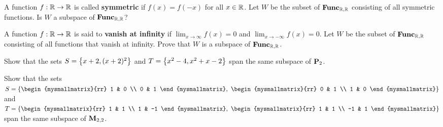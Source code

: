 \begin{ex}
  A function $f:\mathbb{R}\to\mathbb{R}$ is called \textbf{symmetric}%
   if $f(x)=f(-x)$ for all $x\in\mathbb{R}$.  Let
  $W$ be the subset of $\mathbf{Func}_{\mathbb{R},\mathbb{R}}$ consisting of all symmetric
  functions. Is $W$ a subspace of $\mathbf{Func}_{\mathbb{R},\mathbb{R}}$?
\end{ex}

\begin{ex}
  A function $f:\mathbb{R}\to\mathbb{R}$ is said to \textbf{vanish at infinity}%
   if $\lim_{x\to\infty}f(x)=0$ and
  $\lim_{x\to-\infty}f(x)=0$. Let $W$ be the subset of $\mathbf{Func}_{\mathbb{R},\mathbb{R}}$
  consisting of all functions that vanish at infinity. Prove that $W$
  is a subspace of $\mathbf{Func}_{\mathbb{R},\mathbb{R}}$.
\end{ex}

\begin{ex}
  Show that the sets $S=\left\{x+2,(x+2)^2\right\}$ and
  $T=\left\{x^2-4, x^2+x-2\right\}$ span the same subspace of $\mathbf{P}_2$.
\end{ex}

\begin{ex}
  Show that the sets $S=\set{
    \begin{mysmallmatrix}{rr} 1 & 0 \\ 0 & 1 \end{mysmallmatrix},~
    \begin{mysmallmatrix}{rr} 0 & 1 \\ 1 & 0 \end{mysmallmatrix}
  }$ and $T=\set{
    \begin{mysmallmatrix}{rr} 1 & 1 \\ 1 & -1 \end{mysmallmatrix},~
    \begin{mysmallmatrix}{rr} 1 & 1 \\ -1 & 1 \end{mysmallmatrix}
  }$
  span the same subspace of $\mathbf{M}_{2,2}$.
\end{ex}
